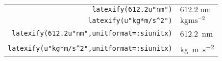 \documentclass{standalone}
\begin{document}
\begin{tabular}{rl}
        \verb+latexify(612.2u"nm")+ & $612.2\;\mathrm{nm}$\\
        \verb+latexify(u"kg*m/s^2")+ & $\mathrm{kg}\mathrm{m}\mathrm{s}^{-2}$\\
        \verb+latexify(612.2u"nm",unitformat=:siunitx)+ & \SI{612.2}{\nano\meter}\\
        \verb+latexify(u"kg*m/s^2",unitformat=:siunitx)+ & \si{\kilo\gram\meter\per\second\tothe{2}}\\
\end{tabular}
\end{document}
